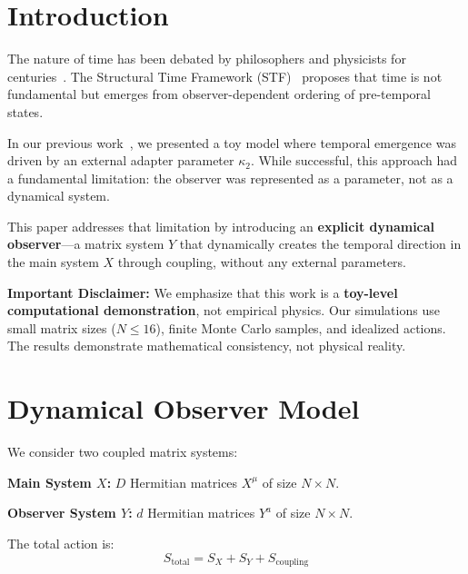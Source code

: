 \documentclass[12pt,a4paper]{article}
\begin{document}
\tableofcontents
\newpage

\section{Introduction}\label{sec:intro}

The nature of time has been debated by philosophers and physicists for 
centuries~\cite{page_wootters_1983, barbour_1999, rovelli_2018}. The Structural Time Framework (STF)~\cite{chanpengpad_stf} 
proposes that time is not fundamental but emerges from observer-dependent 
ordering of pre-temporal states.

In our previous work~\cite{chanpengpad_sgoed_v2}, we presented a toy 
model where temporal emergence was driven by an external adapter parameter 
$\kappa_2$. While successful, this approach had a fundamental limitation: 
the observer was represented as a parameter, not as a dynamical system.

This paper addresses that limitation by introducing an \textbf{explicit 
dynamical observer}---a matrix system $Y$ that dynamically creates the 
temporal direction in the main system $X$ through coupling, without any 
external parameters.

\textbf{Important Disclaimer:} We emphasize that this work is a 
\textbf{toy-level computational demonstration}, not empirical physics. 
Our simulations use small matrix sizes ($N \leq 16$), finite Monte Carlo 
samples, and idealized actions. The results demonstrate mathematical 
consistency, not physical reality.

\section{Dynamical Observer Model}\label{sec:model}

We consider two coupled matrix systems:

\textbf{Main System $X$:} $D$ Hermitian matrices $X^\mu$ of size $N \times N$.

\textbf{Observer System $Y$:} $d$ Hermitian matrices $Y^a$ of size $N \times N$.

The total action is:
\begin{equation}
S_{\text{total}} = S_X + S_Y + S_{\text{coupling}}
\end{equation}
\end{document}
